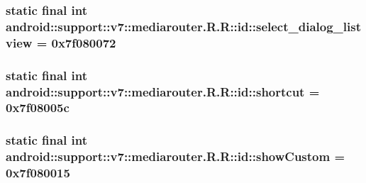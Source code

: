 \hypertarget{classandroid_1_1support_1_1v7_1_1mediarouter_1_1_r_1_1id_be17d1f9dfdd22570dc531a80f5c7fe8}{
\subsubsection[{select\_\-dialog\_\-listview}]{\setlength{\rightskip}{0pt plus 5cm}static final int android::support::v7::mediarouter.R.R::id::select\_\-dialog\_\-listview = 0x7f080072}}
\label{classandroid_1_1support_1_1v7_1_1mediarouter_1_1_r_1_1id_be17d1f9dfdd22570dc531a80f5c7fe8}


\hypertarget{classandroid_1_1support_1_1v7_1_1mediarouter_1_1_r_1_1id_1922258abeb5b181b57652f927d19187}{
\subsubsection[{shortcut}]{\setlength{\rightskip}{0pt plus 5cm}static final int android::support::v7::mediarouter.R.R::id::shortcut = 0x7f08005c}}
\label{classandroid_1_1support_1_1v7_1_1mediarouter_1_1_r_1_1id_1922258abeb5b181b57652f927d19187}


\hypertarget{classandroid_1_1support_1_1v7_1_1mediarouter_1_1_r_1_1id_d1a40ed6f9957ba7343b222c3a776997}{
\subsubsection[{showCustom}]{\setlength{\rightskip}{0pt plus 5cm}static final int android::support::v7::mediarouter.R.R::id::showCustom = 0x7f080015}}
\label{classandroid_1_1support_1_1v7_1_1mediarouter_1_1_r_1_1id_d1a40ed6f9957ba7343b222c3a776997}


